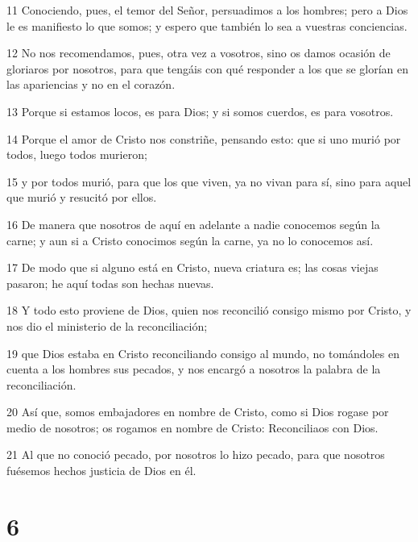 \par 11 Conociendo, pues, el temor del Señor, persuadimos a los hombres; pero a Dios le es manifiesto lo que somos; y espero que también lo sea a vuestras conciencias.
\par 12 No nos recomendamos, pues, otra vez a vosotros, sino os damos ocasión de gloriaros por nosotros, para que tengáis con qué responder a los que se glorían en las apariencias y no en el corazón.
\par 13 Porque si estamos locos, es para Dios; y si somos cuerdos, es para vosotros.
\par 14 Porque el amor de Cristo nos constriñe, pensando esto: que si uno murió por todos, luego todos murieron;
\par 15 y por todos murió, para que los que viven, ya no vivan para sí, sino para aquel que murió y resucitó por ellos.
\par 16 De manera que nosotros de aquí en adelante a nadie conocemos según la carne; y aun si a Cristo conocimos según la carne, ya no lo conocemos así.
\par 17 De modo que si alguno está en Cristo, nueva criatura es; las cosas viejas pasaron; he aquí todas son hechas nuevas.
\par 18 Y todo esto proviene de Dios, quien nos reconcilió consigo mismo por Cristo, y nos dio el ministerio de la reconciliación;
\par 19 que Dios estaba en Cristo reconciliando consigo al mundo, no tomándoles en cuenta a los hombres sus pecados, y nos encargó a nosotros la palabra de la reconciliación.
\par 20 Así que, somos embajadores en nombre de Cristo, como si Dios rogase por medio de nosotros; os rogamos en nombre de Cristo: Reconciliaos con Dios.
\par 21 Al que no conoció pecado, por nosotros lo hizo pecado, para que nosotros fuésemos hechos justicia de Dios en él.

\chapter{6}

